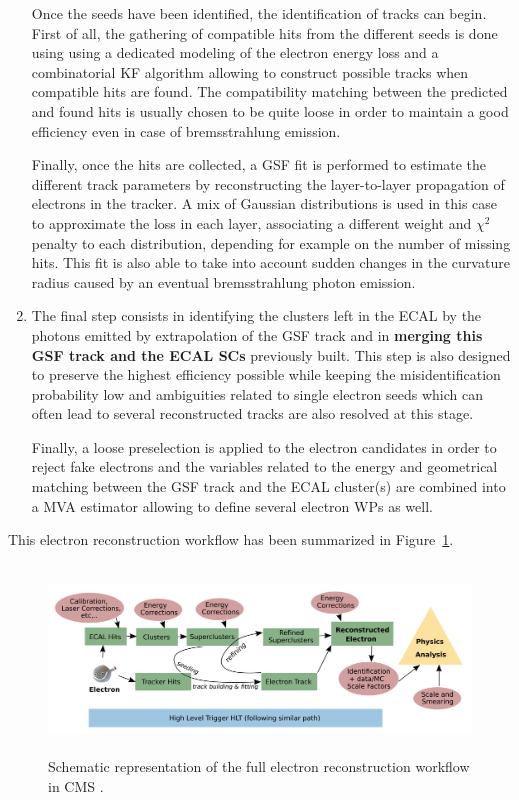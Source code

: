 \documentclass[a4paper, 10pt, openright]{report}
\begin{document}
\begin{enumerate}
Once the seeds have been identified, the identification of tracks can begin. First of all, the gathering of compatible hits from the different seeds is done using using a dedicated modeling of the electron energy loss and a combinatorial \ac{KF} algorithm allowing to construct possible tracks when compatible hits are found. The compatibility matching between the predicted and found hits is usually chosen to be quite loose in order to maintain a good efficiency even in case of bremsstrahlung emission.

Finally, once the hits are collected, a \ac{GSF} fit is performed to estimate the different track parameters by reconstructing the layer-to-layer propagation of electrons in the tracker. A mix of Gaussian distributions is used in this case to approximate the loss in each layer, associating a different weight and $\chi^2$ penalty to each distribution, depending for example on the number of missing hits. This fit is also able to take into account sudden changes in the curvature radius caused by an eventual bremsstrahlung photon emission.

\item The final step consists in identifying the clusters left in the \ac{ECAL} by the photons emitted by extrapolation of the \ac{GSF} track and in \textbf{merging this \ac{GSF} track and the \ac{ECAL} \acp{SC}} previously built. This step is also designed to preserve the highest efficiency possible while keeping the misidentification probability low and ambiguities related to single electron seeds which can often lead to several reconstructed tracks are also resolved at this stage.

Finally, a loose preselection is applied to the electron candidates in order to reject fake electrons and the variables related to the energy and geometrical matching between the \ac{GSF} track and the \ac{ECAL} cluster(s) are combined into a \acf{MVA} estimator allowing to define several electron \acp{WP} as well.
\end{enumerate}

This electron reconstruction workflow has been summarized in Figure~\ref{fig:EleWorkflow}.

\begin{figure}[htbp]
\begin{center}
\includegraphics[width=14cm, height=5cm]{figs/EleWorkflow.png}
\caption{Schematic representation of the full electron reconstruction workflow in \ac{CMS} \cite{EleWorkflow}.}
\label{fig:EleWorkflow}
\end{center}
\end{figure}
\end{document}
